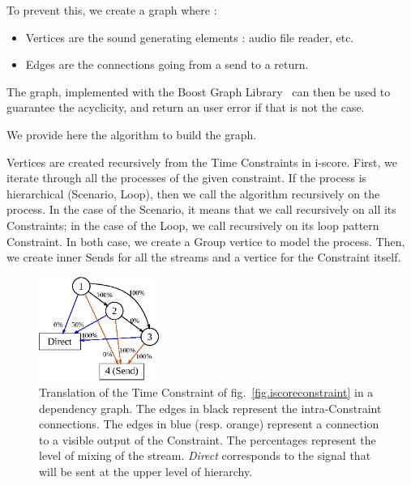 \documentclass{article}
\begin{document}
To prevent this, we create a graph where : 
\begin{itemize}
	\item Vertices are the sound generating elements : audio file reader, etc.
	\item Edges are the connections going from a send to a return.
\end{itemize} 

The graph, implemented with the Boost Graph Library~\cite{siek2001boost} can then be used to 
guarantee the acyclicity, and return an user error if that is not the case.

We provide here the algorithm to build the graph.

Vertices are created recursively from the Time Constraints in i-score.
First, we iterate through all the processes of the given constraint.
If the process is hierarchical (Scenario, Loop), then we call the algorithm recursively on the process.
In the case of the Scenario, it means that we call recursively on all its Constraints; in the case of the Loop, we call recursively on its loop pattern Constraint.
In both case, we create a Group vertice to model the process.
Then, we create inner Sends for all the streams and a vertice for the Constraint itself.

\begin{figure}
	\centering
	\includegraphics[width=0.35\textwidth]{figures/graph1.eps}
	\caption{Translation of the Time Constraint of fig.~\ref{fig.iscoreconstraint} in a dependency graph.
		The edges in black represent the intra-Constraint connections. 
		The edges in blue (resp. orange) represent a connection to a visible output of 
		the Constraint. The percentages represent the level of mixing of the stream.
		\textit{Direct} corresponds to the signal that will be sent at the upper level of hierarchy.}
	\label{fig.graph}
\end{figure}
\end{document}
